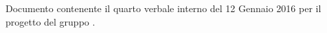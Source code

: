 Documento contenente il quarto verbale interno del 12 Gennaio 2016 per il progetto \progetto{} del gruppo \gruppo.
